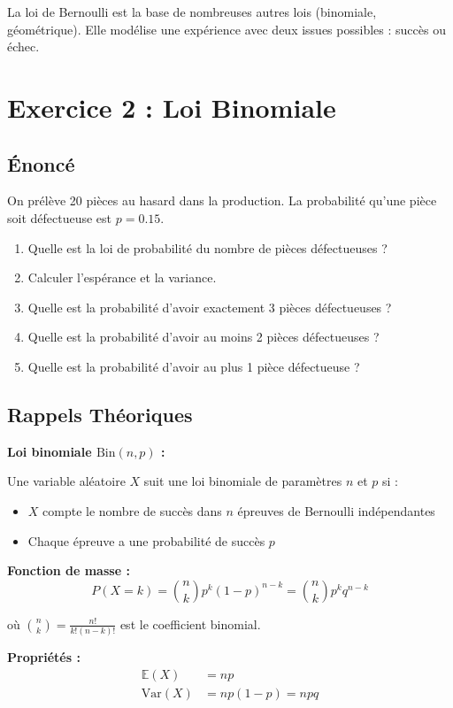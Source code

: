 \documentclass[11pt,a4paper]{article}
\newcommand{\Var}{\text{Var}}
\newcommand{\E}{\mathbb{E}}
\newcommand{\Bin}{\text{Bin}}
\begin{document}
\begin{astucebox}
La loi de Bernoulli est la base de nombreuses autres lois (binomiale, géométrique). Elle modélise une expérience avec deux issues possibles : succès ou échec.
\end{astucebox}

\newpage

\section{Exercice 2 : Loi Binomiale}

\subsection{Énoncé}

On prélève 20 pièces au hasard dans la production. La probabilité qu'une pièce soit défectueuse est $p = 0.15$.

\begin{enumerate}
    \item Quelle est la loi de probabilité du nombre de pièces défectueuses ?
    \item Calculer l'espérance et la variance.
    \item Quelle est la probabilité d'avoir exactement 3 pièces défectueuses ?
    \item Quelle est la probabilité d'avoir au moins 2 pièces défectueuses ?
    \item Quelle est la probabilité d'avoir au plus 1 pièce défectueuse ?
\end{enumerate}

\subsection{Rappels Théoriques}

\begin{rappelbox}
\textbf{Loi binomiale $\Bin(n, p)$ :}

Une variable aléatoire $X$ suit une loi binomiale de paramètres $n$ et $p$ si :
\begin{itemize}
    \item $X$ compte le nombre de succès dans $n$ épreuves de Bernoulli indépendantes
    \item Chaque épreuve a une probabilité de succès $p$
\end{itemize}

\textbf{Fonction de masse :}
$$P(X = k) = \binom{n}{k} p^k (1-p)^{n-k} = \binom{n}{k} p^k q^{n-k}$$

où $\binom{n}{k} = \frac{n!}{k!(n-k)!}$ est le coefficient binomial.

\textbf{Propriétés :}
\begin{align}
\E(X) &= np \\
\Var(X) &= np(1-p) = npq
\end{align}
\end{rappelbox}
\end{document}
